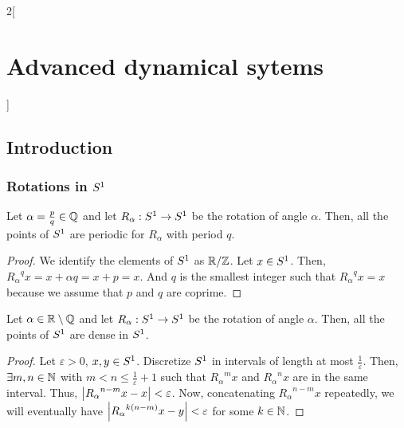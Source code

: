 \documentclass[../../../main_math.tex]{subfiles}
\begin{document}
\begin{multicols}{2}[\section{Advanced dynamical sytems}]
  \subsection{Introduction}
  \subsubsection{Rotations in \texorpdfstring{$\S^1$}{S1}}
  \begin{proposition}
    Let $\alpha=\frac{p}{q}\in\QQ$ and let $R_\alpha:\S^1\to \S^1$ be the rotation of angle $\alpha$. Then, all the points of $\S^1$ are periodic for $R_\alpha$ with period $q$.
  \end{proposition}
  \begin{proof}
    We identify the elements of $\S^1$ as $\quot{\RR}{\ZZ}$. Let $x\in \S^1$. Then, ${R_\alpha}^q x=x+\alpha q=x+p=x$. And $q$ is the smallest integer such that ${R_\alpha}^q x=x$ because we assume that $p$ and $q$ are coprime.
  \end{proof}
  \begin{proposition}
    Let $\alpha\in\RR\setminus\QQ$ and let $R_\alpha:\S^1\to \S^1$ be the rotation of angle $\alpha$. Then, all the points of $\S^1$ are dense in $\S^1$.
  \end{proposition}
  \begin{proof}
    Let $\varepsilon>0$, $x,y\in \S^1$. Discretize $\S^1$ in intervals of length at most $\frac{1}{\varepsilon}$. Then, $\exists m,n\in \NN$ with $m< n\leq \frac{1}{\varepsilon}+1$ such that ${R_\alpha}^m x$ and ${R_\alpha}^nx$ are in the same interval. Thus, $\abs{{R_\alpha}^{n-m}x-x}<\varepsilon$. Now, concatenating ${R_\alpha}^{n-m}x$ repeatedly, we will eventually have $\abs{{R_\alpha}^{k(n-m)}x - y}<\varepsilon$ for some $k\in \NN$.
  \end{proof}
\end{multicols}
\end{document}
